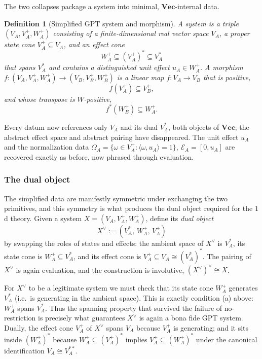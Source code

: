 \documentclass[prl,aps,10pt,superscriptaddress, floatfix]{revtex4-2}
\newtheorem*{defi}{Definition}
\begin{document}
The two collapses package a system into minimal, $\mathbf{Vec}$-internal data.

\begin{defi}[Simplified GPT system and morphism]
A \emph{system} is a triple $(V_A,V_A^+,W_A^+)$ consisting of a finite-dimensional real vector space $V_A$, a proper state cone $V_A^+\subseteq V_A$, and an effect cone
\[
W_A^+\subseteq(V_A^+)^*\subseteq V_A^*
\]
that \emph{spans} $V_A^*$ and contains a distinguished unit effect $u_A\in W_A^+$. A \emph{morphism} $f:(V_A,V_A^+,W_A^+)\to(V_B,V_B^+,W_B^+)$ is a linear map $f:V_A\to V_B$ that is positive,
\[
f(V_A^+)\subseteq V_B^+,
\]
and whose transpose is $W$-positive,
\[
f^*(W_B^+)\subseteq W_A^+ .
\]
\end{defi}

Every datum now references only $V_A$ and its dual $V_A^*$, both objects of $\mathbf{Vec}$; the abstract effect space and abstract pairing have disappeared. The unit effect $u_A$ and the normalization data $\Omega_A=\{\omega\in V_A^+:\langle\omega,u_A\rangle=1\}$, $\mathcal E_A=[0,u_A]$ are recovered exactly as before, now phrased through evaluation.

\subsubsection*{The dual object}

The simplified data are manifestly symmetric under exchanging the two primitives, and this symmetry is what produces the dual object required for the $1$d theory. Given a system $X=(V_A,V_A^+,W_A^+)$, define its \emph{dual object}
\[
X^\vee:=(V_A^*,\,W_A^+,\,V_A^+)
\]
by swapping the roles of states and effects: the ambient space of $X^\vee$ is $V_A^*$, its state cone is $W_A^+\subseteq V_A^*$, and its effect cone is $V_A^+\subseteq V_A\cong(V_A^*)^*$. The pairing of $X^\vee$ is again evaluation, and the construction is involutive, $(X^\vee)^\vee\cong X$.

For $X^\vee$ to be a legitimate system we must check that its state cone $W_A^+$ generates $V_A^*$ (i.e.\ is generating in the ambient space). This is exactly condition (a) above: $W_A^+$ spans $V_A^*$. Thus the spanning property that survived the failure of no-restriction is precisely what guarantees $X^\vee$ is again a bona fide GPT system. Dually, the effect cone $V_A^+$ of $X^\vee$ spans $V_A$ because $V_A^+$ is generating; and it sits inside $(W_A^+)^*$ because $W_A^+\subseteq(V_A^+)^*$ implies $V_A^+\subseteq(W_A^+)^*$ under the canonical identification $V_A\cong V_A^{**}$.
\end{document}

